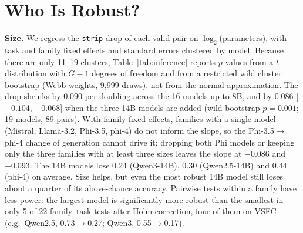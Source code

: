 \documentclass[conference]{IEEEtran}
\begin{document}
\section{Who Is Robust?}\label{sec:who}

\textbf{Size.} We regress the \texttt{strip} drop of each valid pair on $\log_2$(parameters), with task and family fixed effects and standard errors clustered by model. Because there are only 11--19 clusters, Table~\ref{tab:inference} reports $p$-values from a $t$ distribution with $G-1$ degrees of freedom and from a restricted wild cluster bootstrap (Webb weights, 9,999 draws), not from the normal approximation. The drop shrinks by 0.090 per doubling across the 16 models up to 8B, and by 0.086 [$-0.104$, $-0.068$] when the three 14B models are added (wild bootstrap $p = 0.001$; 19 models, 89 pairs). With family fixed effects, families with a single model (Mistral, Llama-3.2, Phi-3.5, phi-4) do not inform the slope, so the Phi-3.5$\rightarrow$phi-4 change of generation cannot drive it; dropping both Phi models or keeping only the three families with at least three sizes leaves the slope at $-0.086$ and $-0.093$. The 14B models lose 0.24 (Qwen3-14B), 0.30 (Qwen2.5-14B) and 0.44 (phi-4) on average. Size helps, but even the most robust 14B model still loses about a quarter of its above-chance accuracy. Pairwise tests within a family have less power: the largest model is significantly more robust than the smallest in only 5 of 22 family--task tests after Holm correction, four of them on VSFC (e.g.\ Qwen2.5, 0.73$\rightarrow$0.27; Qwen3, 0.55$\rightarrow$0.17).
\end{document}

